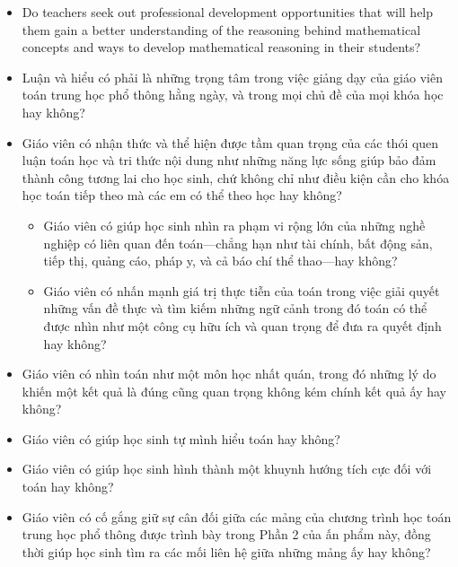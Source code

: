 \documentclass[
  10pt,
  a4paper,
  landscape,
  twoside,
  openany
]{scrbook}
\newcommand{\VI}[1]{#1}
\begin{document}
{{\begin{itemize}
      \begin{itemize}
        \item Do teachers ensure that students at all levels have mathematics experiences that are focused on reasoning and sense making?
        \item Are teachers advocates for their students, ensuring that schools offer all students the courses that are crucial for their mathematical success?
      \end{itemize}
    \item Do teachers seek out professional development opportunities that will help them gain a better understanding of the reasoning behind mathematical concepts and ways to develop mathematical reasoning in their students?
  \end{itemize}}
}
{
\VI{
  \begin{itemize}
    \item Luận và hiểu có phải là những trọng tâm trong việc giảng dạy của giáo viên toán trung học phổ thông hằng ngày, và trong mọi chủ đề của mọi khóa học hay không?
    \item Giáo viên có nhận thức và thể hiện được tầm quan trọng của các thói quen luận toán học và tri thức nội dung như những năng lực sống giúp bảo đảm thành công tương lai cho học sinh, chứ không chỉ như điều kiện cần cho khóa học toán tiếp theo mà các em có thể theo học hay không?
      \begin{itemize}
        \item Giáo viên có giúp học sinh nhìn ra phạm vi rộng lớn của những nghề nghiệp có liên quan đến toán---chẳng hạn như tài chính, bất động sản, tiếp thị, quảng cáo, pháp y, và cả báo chí thể thao---hay không?
        \item Giáo viên có nhấn mạnh giá trị thực tiễn của toán trong việc giải quyết những vấn đề thực và tìm kiếm những ngữ cảnh trong đó toán có thể được nhìn như một công cụ hữu ích và quan trọng để đưa ra quyết định hay không?
      \end{itemize}
    \item Giáo viên có nhìn toán như một môn học nhất quán, trong đó những lý do khiến một kết quả là đúng cũng quan trọng không kém chính kết quả ấy hay không?
    \item Giáo viên có giúp học sinh tự mình hiểu toán hay không?
    \item Giáo viên có giúp học sinh hình thành một khuynh hướng tích cực đối với toán hay không?
    \item Giáo viên có cố gắng giữ sự cân đối giữa các mảng của chương trình học toán trung học phổ thông được trình bày trong Phần 2 của ấn phẩm này, đồng thời giúp học sinh tìm ra các mối liên hệ giữa những mảng ấy hay không?

\end{itemize}}}
\end{document}
